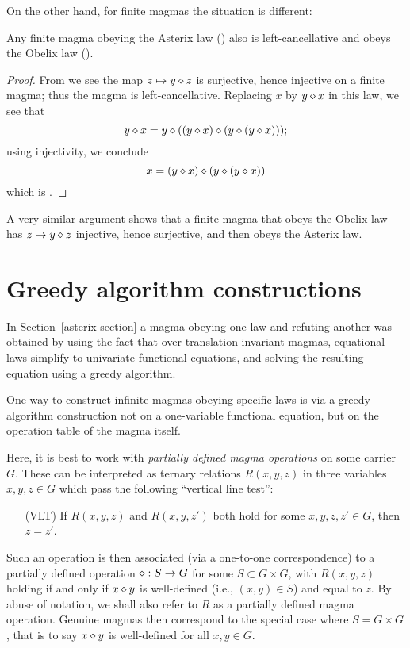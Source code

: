 On the other hand, for finite magmas the situation is different:

\begin{proposition}\label{asterix-obelix-finite}  Any finite magma obeying the Asterix law () also is left-cancellative and obeys the Obelix law ().
\end{proposition}

\begin{proof}  From  we see the map $z \mapsto y \diamond z$ is surjective, hence injective on a finite magma; thus the magma is left-cancellative.  Replacing $x$ by $y \diamond x$ in this law, we see that
$$ y \diamond x = y \diamond ((y\diamond x) \diamond (y \diamond (y \diamond x)));$$
using injectivity, we conclude
$$ x = (y\diamond x) \diamond (y \diamond (y \diamond x))$$
which is .
\end{proof}

A very similar argument shows that a finite magma that obeys the Obelix law has $z \mapsto y \diamond z$ injective, hence surjective, and then obeys the Asterix law.


\section{Greedy algorithm constructions}\label{greedy-section}

In Section~\ref{asterix-section} a magma obeying one law and refuting another was obtained by using the
fact that over translation-invariant magmas, equational laws simplify to univariate functional equations,
and solving the resulting equation using a greedy algorithm.

One way to construct infinite magmas obeying specific laws is via a greedy algorithm construction not on a
one-variable functional equation, but on the operation table of the magma itself.

Here, it is best to work with \emph{partially defined magma operations} on some carrier $G$.  These can be interpreted as ternary relations $R(x,y,z)$ in three variables $x,y,z \in G$ which pass the following ``vertical line test'':

\begin{itemize}
  \item[(VLT)] If $R(x,y,z)$ and $R(x,y,z')$ both hold for some $x,y,z,z' \in G$, then $z=z'$.
\end{itemize}

Such an operation is then associated (via a one-to-one correspondence) to a partially defined operation $\diamond : S \to G$ for some $S \subset G \times G$, with $R(x,y,z)$ holding if and only if $x \diamond y$ is well-defined (i.e., $(x,y) \in S$) and equal to $z$.  By abuse of notation, we shall also refer to $R$ as a partially defined magma operation.  Genuine magmas then correspond to the special case where $S = G \times G$, that is to say $x \diamond y$ is well-defined for all $x,y \in G$.

